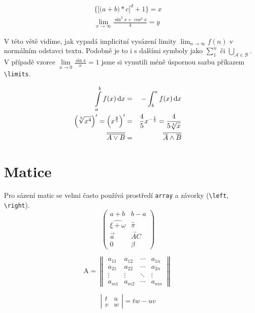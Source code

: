 \documentclass[a4paper,11pt,twocolumn]{article}
\begin{document}
\begin{eqnarray}
\label{rovnice}
\bigg\{ \Big[ \big( a+b \big) *c \Big]^d +1 \bigg\} = x \\
\lim_{x \to \infty} \frac{\sin^2x+\cos^2x}{4} = y \nonumber
\end{eqnarray}

\par
V této větě vidíme, jak vypadá implicitní vysázení limity $\lim_{n \to \infty} f(n)$  v normálním odstavci textu. Podobně je to i s dalšími symboly jako $\sum\nolimits_{1}^n$ či $\bigcup_{\mathcal{A} \in \mathcal{B}}$. V případě vzorce  $\lim\limits_{x \to 0}\frac{\sin x}{x}=1$ jsme si vynutili méně úspornou sazbu příkazem \verb|\limits|.

\begin{eqnarray}
\int\displaylimits_a^b f(x) \, \mathrm{d} x & = & -\int_b^a f(x) \, \mathrm{d} x\\
\Big( \sqrt[5]{x^4} \Big)' = \Big( x^\frac{4}{5} \Big)' & = & \frac{4}{5}x^{-\frac{1}{5}} = \frac{4}{5\sqrt[5]{x}}\\
\overline{\overline{A \vee B}} & = & \overline{\overline{A} \wedge \overline{B}}
\end{eqnarray}

\section{Matice}
\noindent Pro sázení matic se velmi často používá prostředí \verb|array| a závorky (\verb|\left|, \verb|\right|).\\
\[ \left( \begin{array}{cc}
a+b & b-a \\
\widehat{\xi + \omega} & \hat{\pi} \\
\vec{a} & \overleftrightarrow{AC} \\
0 & \beta \end{array} \right)\] 

$$\mathrm{A=}\begin{Vmatrix} 
a_{11} & a_{12} & \cdots & a_{1n} \\
a_{21} & a_{22} & \cdots & a_{2n} \\
\vdots & \vdots & \ddots & \vdots \\
a_{m1} & a_{m2} & \cdots & a_{mn}
\end{Vmatrix}$$

\[ \left| \begin{array}{cc}
t & u \\
v & w 
\end{array} \right| = tw-uv\] 
\end{document}

